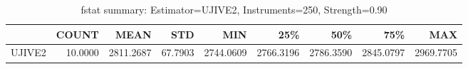 \begin{table}[ht]
\centering
\caption{fstat summary: Estimator=UJIVE2, Instruments=250, Strength=0.90}
\begin{tabular}{lrrrrrrrr}
\toprule
 & COUNT & MEAN & STD & MIN & 25\% & 50\% & 75\% & MAX \\
\midrule
UJIVE2 & 10.0000 & 2811.2687 & 67.7903 & 2744.0609 & 2766.3196 & 2786.3590 & 2845.0797 & 2969.7705 \\
\bottomrule
\end{tabular}
\end{table}

